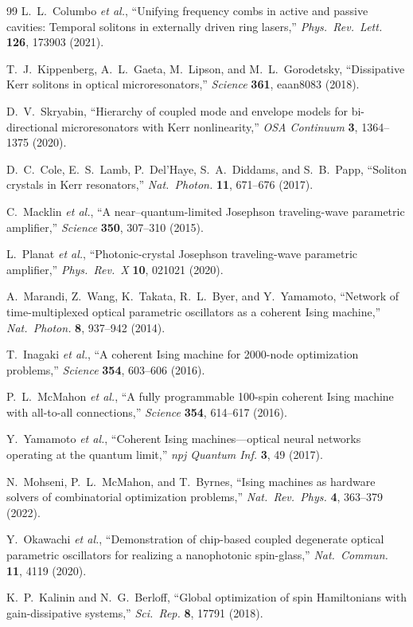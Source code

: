 \documentclass[11pt,letterpaper]{article}
\begin{document}
\begin{thebibliography}{99}
L.~L.~Columbo \textit{et al.}, ``Unifying frequency combs in active and passive cavities: Temporal solitons in externally driven ring lasers,'' \textit{Phys.\ Rev.\ Lett.} \textbf{126}, 173903 (2021).

T.~J.~Kippenberg, A.~L.~Gaeta, M.~Lipson, and M.~L.~Gorodetsky, ``Dissipative Kerr solitons in optical microresonators,'' \textit{Science} \textbf{361}, eaan8083 (2018).

D.~V.~Skryabin, ``Hierarchy of coupled mode and envelope models for bi-directional microresonators with Kerr nonlinearity,'' \textit{OSA Continuum} \textbf{3}, 1364--1375 (2020).

D.~C.~Cole, E.~S.~Lamb, P.~Del'Haye, S.~A.~Diddams, and S.~B.~Papp, ``Soliton crystals in Kerr resonators,'' \textit{Nat.\ Photon.} \textbf{11}, 671--676 (2017).

C.~Macklin \textit{et al.}, ``A near--quantum-limited Josephson traveling-wave parametric amplifier,'' \textit{Science} \textbf{350}, 307--310 (2015).

L.~Planat \textit{et al.}, ``Photonic-crystal Josephson traveling-wave parametric amplifier,'' \textit{Phys.\ Rev.\ X} \textbf{10}, 021021 (2020).

A.~Marandi, Z.~Wang, K.~Takata, R.~L.~Byer, and Y.~Yamamoto, ``Network of time-multiplexed optical parametric oscillators as a coherent Ising machine,'' \textit{Nat.\ Photon.} \textbf{8}, 937--942 (2014).

T.~Inagaki \textit{et al.}, ``A coherent Ising machine for 2000-node optimization problems,'' \textit{Science} \textbf{354}, 603--606 (2016).

P.~L.~McMahon \textit{et al.}, ``A fully programmable 100-spin coherent Ising machine with all-to-all connections,'' \textit{Science} \textbf{354}, 614--617 (2016).

Y.~Yamamoto \textit{et al.}, ``Coherent Ising machines---optical neural networks operating at the quantum limit,'' \textit{npj Quantum Inf.} \textbf{3}, 49 (2017).

N.~Mohseni, P.~L.~McMahon, and T.~Byrnes, ``Ising machines as hardware solvers of combinatorial optimization problems,'' \textit{Nat.\ Rev.\ Phys.} \textbf{4}, 363--379 (2022).

Y.~Okawachi \textit{et al.}, ``Demonstration of chip-based coupled degenerate optical parametric oscillators for realizing a nanophotonic spin-glass,'' \textit{Nat.\ Commun.} \textbf{11}, 4119 (2020).

K.~P.~Kalinin and N.~G.~Berloff, ``Global optimization of spin Hamiltonians with gain-dissipative systems,'' \textit{Sci.\ Rep.} \textbf{8}, 17791 (2018).

\end{thebibliography}
\end{document}

